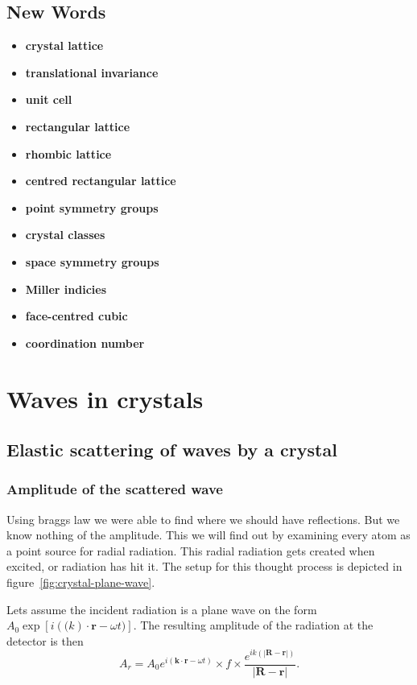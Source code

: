 \documentclass[11pt]{article}
\begin{document}
\subsection{New Words}

\begin{itemize}
	\item \textbf{crystal lattice}
	\item \textbf{translational invariance}
	\item \textbf{unit cell}
	\item \textbf{rectangular lattice}
	\item \textbf{rhombic lattice}
	\item \textbf{centred rectangular lattice}
	\item \textbf{point symmetry groups}
	\item \textbf{crystal classes} 
	\item \textbf{space symmetry groups}
	\item \textbf{Miller indicies}
	\item \textbf{face-centred cubic}
	\item \textbf{coordination number}
\end{itemize}

\newpage
\section{Waves in crystals}

\subsection{Elastic scattering of waves by a crystal}
\subsubsection{Amplitude of the scattered wave}
Using braggs law we were able to find where we should have reflections. But we know nothing of the amplitude. This we will find out by examining every atom as a point source for radial radiation. This radial radiation gets created when excited, or radiation has hit it. The setup for this thought process is depicted in figure~\ref{fig:crystal-plane-wave}. 

Lets assume the incident radiation is a plane wave on the form $A_0 \exp{[i(\mathbf(k) \cdot \mathbf{r} - \omega t)]}$. The resulting amplitude of the radiation at the detector is then
\begin{equation}
	A_r = A_0 e^{i(\mathbf{k} \cdot \mathbf{r} - \omega t)} \times f \times \frac{e^{ik(|\mathbf{R} - \mathbf{r}|)}}{|\mathbf{R}-\mathbf{r}|}.
\end{equation}
\end{document}
